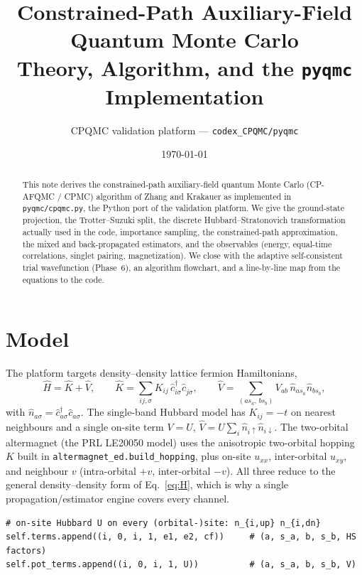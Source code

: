 \documentclass[11pt]{article}
\title{\textbf{Constrained-Path Auxiliary-Field Quantum Monte Carlo}\\[2pt]
\large Theory, Algorithm, and the \texttt{pyqmc} Implementation}
\author{CPQMC validation platform --- \texttt{codex\_CPQMC/pyqmc}}
\date{\today}
\newcommand{\cre}[1]{\hat{c}^{\dagger}_{#1}}
\newcommand{\ann}[1]{\hat{c}^{\phantom{\dagger}}_{#1}}
\begin{document}
\maketitle

\begin{abstract}
This note derives the constrained-path auxiliary-field quantum Monte Carlo
(CP-AFQMC / CPMC) algorithm of Zhang and Krakauer as implemented in
\texttt{pyqmc/cpqmc.py}, the Python port of the validation platform. We give the
ground-state projection, the Trotter--Suzuki split, the discrete
Hubbard--Stratonovich transformation actually used in the code, importance
sampling, the constrained-path approximation, the mixed and back-propagated
estimators, and the observables (energy, equal-time correlations, singlet pairing,
magnetization). We close with the adaptive self-consistent trial wavefunction
(Phase~6), an algorithm flowchart, and a line-by-line map from the equations to
the code.
\end{abstract}

\tableofcontents

\section{Model}
The platform targets density--density lattice fermion Hamiltonians,
\begin{equation}
\hat H = \hat K + \hat V,\qquad
\hat K = \sum_{ij,\sigma} K_{ij}\,\cre{i\sigma}\ann{j\sigma},\qquad
\hat V = \sum_{(a s_a,\, b s_b)} V_{ab}\, \hat n_{a s_a}\hat n_{b s_b},
\label{eq:H}
\end{equation}
with $\hat n_{a\sigma}=\cre{a\sigma}\ann{a\sigma}$. The single-band Hubbard model
has $K_{ij}=-t$ on nearest neighbours and a single on-site term
$V=U$, $\hat V = U\sum_i \hat n_{i\uparrow}\hat n_{i\downarrow}$. The two-orbital
altermagnet (the PRL LE20050 model) uses the anisotropic two-orbital hopping
$K$ built in \texttt{altermagnet\_ed.build\_hopping}, plus on-site $u_{xx}$,
inter-orbital $u_{xy}$, and neighbour $v$ (intra-orbital $+v$, inter-orbital
$-v$). All three reduce to the general density--density form of
Eq.~\eqref{eq:H}, which is why a single propagation/estimator engine covers
every channel.

\begin{lstlisting}[caption={Interaction stored as a generic density--density term
list (\texttt{LatticeModel.\_build\_terms}).}]
# on-site Hubbard U on every (orbital-)site: n_{i,up} n_{i,dn}
self.terms.append((i, 0, i, 1, e1, e2, cf))     # (a, s_a, b, s_b, HS factors)
self.pot_terms.append((i, 0, i, 1, U))          # (a, s_a, b, s_b, V)
\end{lstlisting}
\end{document}
